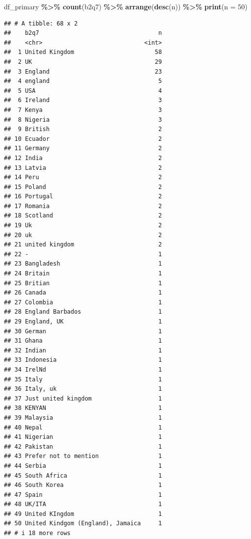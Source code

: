 \documentclass[
]{article}
\newenvironment{Shaded}{\begin{snugshade}}{\end{snugshade}}
\newcommand{\AttributeTok}[1]{\textcolor[rgb]{0.13,0.29,0.53}{#1}}
\newcommand{\DecValTok}[1]{\textcolor[rgb]{0.00,0.00,0.81}{#1}}
\newcommand{\FunctionTok}[1]{\textcolor[rgb]{0.13,0.29,0.53}{\textbf{#1}}}
\newcommand{\NormalTok}[1]{#1}
\newcommand{\SpecialCharTok}[1]{\textcolor[rgb]{0.81,0.36,0.00}{\textbf{#1}}}
\begin{document}
\begin{Shaded}
\begin{Highlighting}[]
\NormalTok{df\_primary }\SpecialCharTok{\%\textgreater{}\%} \FunctionTok{count}\NormalTok{(b2q7) }\SpecialCharTok{\%\textgreater{}\%} \FunctionTok{arrange}\NormalTok{(}\FunctionTok{desc}\NormalTok{(n)) }\SpecialCharTok{\%\textgreater{}\%} \FunctionTok{print}\NormalTok{(}\AttributeTok{n =} \DecValTok{50}\NormalTok{)}
\end{Highlighting}
\end{Shaded}

\begin{verbatim}
## # A tibble: 68 x 2
##    b2q7                                  n
##    <chr>                             <int>
##  1 United Kingdom                       58
##  2 UK                                   29
##  3 England                              23
##  4 england                               5
##  5 USA                                   4
##  6 Ireland                               3
##  7 Kenya                                 3
##  8 Nigeria                               3
##  9 British                               2
## 10 Ecuador                               2
## 11 Germany                               2
## 12 India                                 2
## 13 Latvia                                2
## 14 Peru                                  2
## 15 Poland                                2
## 16 Portugal                              2
## 17 Romania                               2
## 18 Scotland                              2
## 19 Uk                                    2
## 20 uk                                    2
## 21 united kingdom                        2
## 22 -                                     1
## 23 Bangladesh                            1
## 24 Britain                               1
## 25 Britian                               1
## 26 Canada                                1
## 27 Colombia                              1
## 28 England Barbados                      1
## 29 England, UK                           1
## 30 German                                1
## 31 Ghana                                 1
## 32 Indian                                1
## 33 Indonesia                             1
## 34 IrelNd                                1
## 35 Italy                                 1
## 36 Italy, uk                             1
## 37 Just united kingdom                   1
## 38 KENYAN                                1
## 39 Malaysia                              1
## 40 Nepal                                 1
## 41 Nigerian                              1
## 42 Pakistan                              1
## 43 Prefer not to mention                 1
## 44 Serbia                                1
## 45 South Africa                          1
## 46 South Korea                           1
## 47 Spain                                 1
## 48 UK/ITA                                1
## 49 United KIngdom                        1
## 50 United Kindgom (England), Jamaica     1
## # i 18 more rows
\end{verbatim}
\end{document}
